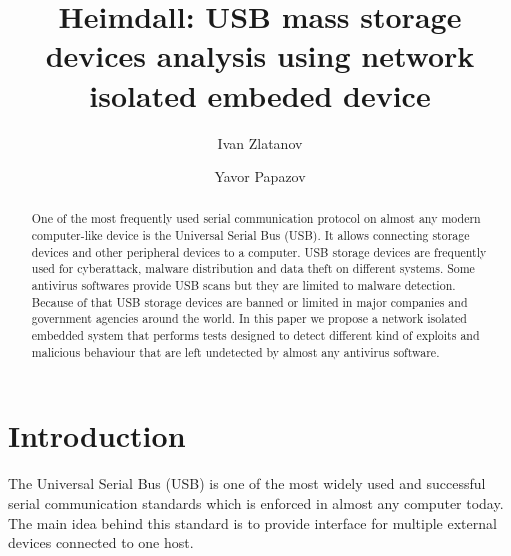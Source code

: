 \documentclass[sigconf]{acmart}
\begin{document}
\title{Heimdall: USB mass storage devices analysis using network isolated embeded device}

\author{Ivan Zlatanov}

\author{Yavor Papazov}

\renewcommand{\shortauthors}{Ivan and Yavor}

\begin{abstract}
\quad One of the most frequently used serial communication protocol on almost any modern computer-like device is the Universal Serial Bus (USB). It allows connecting storage devices and other peripheral devices to a computer. USB storage devices are frequently used for cyberattack, malware distribution and data theft on different systems. Some antivirus softwares provide USB scans but they are limited to malware detection. Because of that USB storage devices are banned or limited in major companies and government agencies around the world. In this paper we propose a network isolated embedded system that performs tests designed to detect different kind of exploits and malicious behaviour that are left undetected by almost any antivirus software.
\end{abstract}


\maketitle

\section{Introduction}
\par \quad The Universal Serial Bus (USB) is one of the most widely used and successful serial communication standards which is enforced in almost any computer today. The main idea behind this standard is to provide interface for multiple external devices connected to one host.
\end{document}
